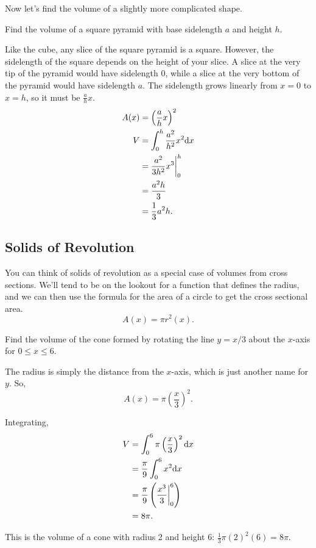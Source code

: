 Now let's find the volume of a slightly more complicated shape.
\begin{example}
	Find the volume of a square pyramid with base sidelength $a$ and height $h$.
\end{example}
\begin{answer}
	Like the cube, any slice of the square pyramid is a square.
	However, the sidelength of the square depends on the height of your slice.
	A slice at the very tip of the pyramid would have sidelength 0, while a slice at the very bottom of the pyramid would have sidelength $a$.
	The sidelength grows linearly from $x=0$ to $x=h$, so it must be $\frac{a}{h}x$.
	\begin{align*}
		A(x) &= \left(\frac{a}{h}x\right)^2 \\
		V &= \int_{0}^{h}{\frac{a^2}{h^2}x^2\mathrm{d} x} \\
		&= \frac{a^2}{3h^2}x^3 \biggr\rvert_0^h \\
		&= \frac{a^2h}{3} \\
		&= \frac{1}{3}a^2 h.
	\end{align*}
\end{answer}

\subsection{Solids of Revolution}
You can think of solids of revolution as a special case of volumes from cross sections.
We'll tend to be on the lookout for a function that defines the radius, and we can then use the formula for the area of a circle to get the cross sectional area.
\begin{equation*}
	A(x) = \pi r^2(x).
\end{equation*}

\begin{example}
	Find the volume of the cone formed by rotating the line $y=x/3$ about the $x$-axis for $0 \leq x \leq 6$.
\end{example}
\begin{answer}
	The radius is simply the distance from the $x$-axis, which is just another name for $y$.
	So,
	\begin{equation*}
		A(x) = \pi \left(\frac{x}{3}\right)^2.
	\end{equation*}
	
	Integrating,
	\begin{align*}
		V &= \int_{0}^{6}{\pi\left(\frac{x}{3}\right)^2\mathrm{d} x} \\
		&= \frac{\pi}{9}\int_{0}^{6}{x^2\mathrm{d} x} \\
		&= \frac{\pi}{9}\left(\frac{x^3}{3}\biggr\rvert_0^6\right) \\
		&= 8\pi.
	\end{align*}
	
	This is the volume of a cone with radius 2 and height 6: $\frac{1}{3}\pi(2)^2(6)=8\pi$.
\end{answer}



